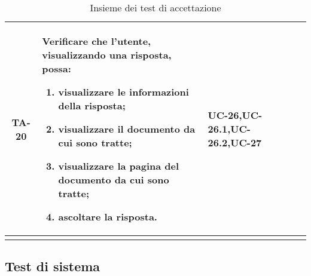 \begin{xltabular}{\textwidth}{| c | X | X | c |}
     TA-20 & Verificare che l'utente, visualizzando una risposta, possa:
    \begin{enumerate}
        \item visualizzare le informazioni della risposta;
        \item visualizzare il documento da cui sono tratte;
        \item visualizzare la pagina del documento da cui sono tratte;
        \item ascoltare la risposta.
        
    \end{enumerate}& UC-26,\newline UC-26.1,\newline UC-26.2,\newline UC-27 & \textcolor{xmarkcolor}{} \\
    \hline

     \caption{Insieme dei test di accettazione} 
    
\end{xltabular}
\endgroup


\subsection{Test di sistema}

